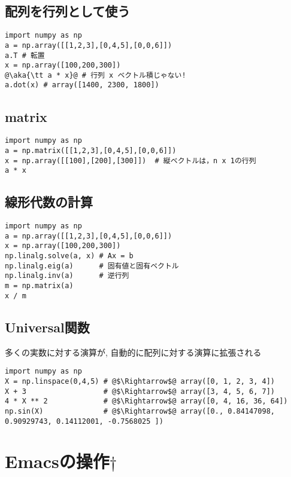 \documentclass[landscape,7pt,dvipdfmx]{article}
\newcommand{\aka}[1]{{\color{red}{#1}}}
\begin{document}
\begin{multicols*}{3}
\subsection{配列を行列として使う}
\begin{lstlisting}
import numpy as np
a = np.array([[1,2,3],[0,4,5],[0,0,6]])
a.T # 転置
x = np.array([100,200,300])
@\aka{\tt a * x}@ # 行列 x ベクトル積じゃない!
a.dot(x) # array([1400, 2300, 1800])  
\end{lstlisting}

\subsection{matrix}
\begin{lstlisting}
import numpy as np
a = np.matrix([[1,2,3],[0,4,5],[0,0,6]])
x = np.array([[100],[200],[300]])  # 縦ベクトルは，n x 1の行列
a * x 
\end{lstlisting}

\subsection{線形代数の計算}
\begin{lstlisting}
import numpy as np
a = np.array([[1,2,3],[0,4,5],[0,0,6]])
x = np.array([100,200,300])
np.linalg.solve(a, x) # Ax = b
np.linalg.eig(a)      # 固有値と固有ベクトル
np.linalg.inv(a)      # 逆行列
m = np.matrix(a)
x / m 
\end{lstlisting}

\subsection{Universal関数}
多くの実数に対する演算が, 自動的に配列に対する演算に拡張される
\begin{lstlisting}
import numpy as np
X = np.linspace(0,4,5) # @$\Rightarrow$@ array([0, 1, 2, 3, 4])
X + 3                  # @$\Rightarrow$@ array([3, 4, 5, 6, 7])
4 * X ** 2             # @$\Rightarrow$@ array([0, 4, 16, 36, 64])
np.sin(X)              # @$\Rightarrow$@ array([0., 0.84147098, 0.90929743, 0.14112001, -0.7568025 ])
\end{lstlisting}

\appendix

\section{Emacsの操作$\dagger$}
{\footnotesize
}
\end{multicols*}
\end{document}
